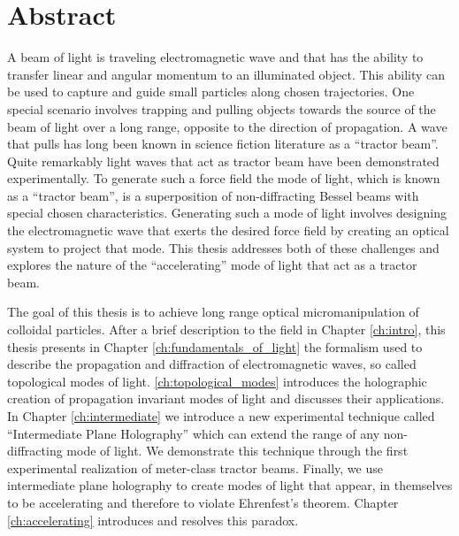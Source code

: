 \chapter*{Abstract}
\label{ch:abstract}


{
\fancyhf{}
}


A beam of light is traveling electromagnetic wave and that has the ability to transfer linear and angular momentum to an illuminated object. This ability can be used to capture and guide small particles along chosen trajectories. One special scenario involves trapping and pulling objects towards the source of the beam of light over a long range, opposite to the direction of propagation. A wave that pulls has long been known in science fiction literature as a ``tractor beam''. Quite remarkably light waves that act as tractor beam have been demonstrated experimentally. To generate such a force field the mode of light, which is known as a ``tractor beam'', is a superposition of non-diffracting Bessel beams with special chosen characteristics. Generating such a mode of light involves designing the electromagnetic wave that exerts the desired force field by creating an optical system to project that mode. This thesis addresses both of these challenges and explores the nature of the ``accelerating'' mode of light that act as a tractor beam. 

The goal of this thesis is to achieve long range optical micromanipulation of colloidal particles. After a brief description to the field in Chapter \ref{ch:intro}, this thesis presents in Chapter \ref{ch:fundamentals_of_light} the formalism used to describe the propagation and diffraction of electromagnetic waves, so called topological modes of light. \ref{ch:topological_modes} introduces the holographic creation of propagation invariant modes of light and discusses their applications. In Chapter \ref{ch:intermediate} we introduce a new experimental technique called ``Intermediate Plane Holography'' which can extend the range of any non-diffracting mode of light. We demonstrate this technique through the first experimental realization of meter-class tractor beams. Finally, we use intermediate plane holography to create modes of light that appear, in themselves to be accelerating and therefore to violate  Ehrenfest's theorem. Chapter \ref{ch:accelerating} introduces and resolves this paradox.